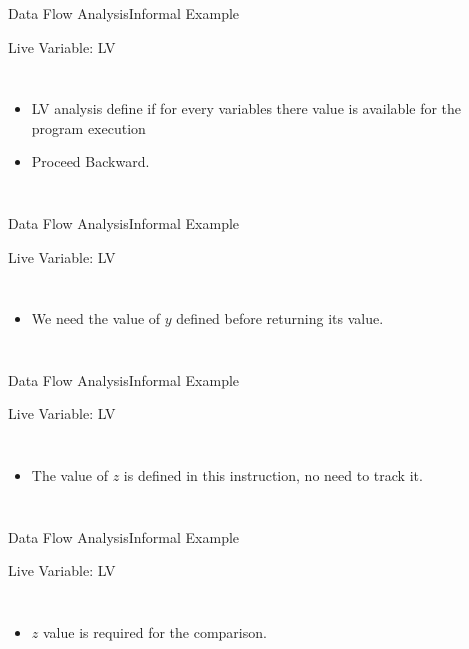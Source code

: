 \begin{frame}{Data Flow Analysis}{Informal Example}
\begin{exampleblock}{Live Variable: LV}
	\begin{columns}
		\begin{itemize}
			\small
			\item LV analysis define if for every variables there value is available for the program execution
			\item Proceed Backward.
		\end{itemize}
		
		
\end{columns}	
\end{exampleblock}
\end{frame}

\begin{frame}{Data Flow Analysis}{Informal Example}
\begin{exampleblock}{Live Variable: LV}
	\begin{columns}
		\begin{itemize}
			\small
			\item We need the value of $y$ defined before returning its value. 
		\end{itemize}
		
		
	\end{columns}	
\end{exampleblock}
\end{frame}


\begin{frame}{Data Flow Analysis}{Informal Example}
\begin{exampleblock}{Live Variable: LV}
	\begin{columns}
		\column{0.45\linewidth}
		\begin{itemize}
			\small
			\item The value of $z$ is defined in this instruction, no need to track it. 
		\end{itemize}
		
		\column{0.55\linewidth}
		
	\end{columns}	
\end{exampleblock}
\end{frame}

\begin{frame}{Data Flow Analysis}{Informal Example}
\begin{exampleblock}{Live Variable: LV}
	\begin{columns}
		\begin{itemize}
			\small
			\item $z$ value is required for the comparison. 
		\end{itemize}
		
		
	\end{columns}	
\end{exampleblock}
\end{frame}


